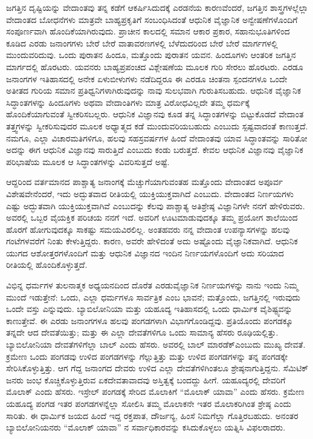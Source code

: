 ಜಗತ್ತಿನ ದೃಷ್ಟಿಯನ್ನು ವೇದಾಂತವು ತನ್ನ ಕಡೆಗೆ ಆಕರ್ಷಿಸಿದುದಕ್ಕೆ ಎರಡನೆಯ ಕಾರಣವೆಂದರೆ, ಜಗತ್ತಿನ ಶಾಸ್ತ್ರಗಳಲ್ಲೆಲ್ಲಾ ವೇದಾಂತದ ಬೋಧನೆಗಳು ಮಾತ್ರವೇ ಬಾಹ್ಯಪ್ರಕೃತಿಗೆ ಸಂಬಂಧಿಸಿದಂತೆ ಆಧುನಿಕ ವೈಜ್ಞಾನಿಕ ಅನ್ವೇಷಣೆಗಳೊಂದಿಗೆ ಸಂಪೂರ್ಣವಾಗಿ ಹೊಂದಿಕೆಯಾಗಿರುವುದು. ಪ್ರಾಚೀನ ಕಾಲದಲ್ಲಿ ಸಮಾನ ಆಕಾರ ಪ್ರಕಾರ, ಸಹಾನುಭೂತಿಗಳಿಂದ ಕೂಡಿದ ಎರಡು ಜನಾಂಗಗಳು ಬೇರೆ ಬೇರೆ ವಾತಾವರಣಗಳಲ್ಲಿ ಬೆಳೆದುದರಿಂದ ಬೇರೆ ಬೇರೆ ಮಾರ್ಗಗಳಲ್ಲಿ ಮುಂದುವರಿದುವು. ಒಂದು ಪುರಾತನ ಹಿಂದೂ, ಮತ್ತೊಂದು ಪುರಾತನ ಯವನ. ಹಿಂದೂಗಳು ಆಂತರಿಕ ಜಗತ್ತಿನ ಮಾರ್ಗದಲ್ಲಿ ಹೊರಟರು. ಯವನರು ಬಾಹ್ಯಪ್ರಪಂಚದ ವಿಶ್ಲೇಷಣೆಯ ಮೂಲಕ ಗುರಿ ಸೇರಲು ಹೊರ\-ಟರು. ಎರಡೂ ಜನಾಂಗಗಳ ಇತಿಹಾಸದಲ್ಲಿ ಅನೇಕ ಏಳುಬೀಳುಗಳು ನಡೆದಿದ್ದರೂ ಈ ಎರಡೂ ಚಿಂತನಾ ಸ್ಪಂದನಗಳೂ ಒಂದೇ ಅತೀತದ ಗುರಿಯ ಸಮಾನ ಪ್ರತಿಧ್ವನಿಗಳಾಗಿರುವುದನ್ನು ನಾವು ಸುಲಭವಾಗಿ ಗುರುತಿಸಬಹುದು. ಆಧುನಿಕ ವೈಜ್ಞಾನಿಕ ಸಿದ್ಧಾಂತಗಳನ್ನು ಹಿಂದೂಗಳು ಅಥವಾ ವೇದಾಂತಿಗಳು ಮಾತ್ರ ವಿರೋಧವಿಲ್ಲದೇ ತಮ್ಮ ಧರ್ಮಕ್ಕೆ ಹೊಂದಿಕೆಯಾಗುವಂತೆ ಸ್ವೀಕರಿಸಬಲ್ಲರು. ಆಧುನಿಕ ವಿಜ್ಞಾನವು ಕೂಡ ತನ್ನ ಸಿದ್ಧಾಂತಗಳನ್ನು ಬಿಟ್ಟುಕೊಡದೆ ವೇದಾಂತ ತತ್ತ್ವಗಳನ್ನು ಸ್ವೀಕರಿಸುವುದರ ಮೂಲಕ ಅಧ್ಯಾತ್ಮದ ಕಡೆ ಮುಂದುವರಿಯಬಹುದು ಎಂಬುದು ಸ್ಪಷ್ಟವಾದಂತೆ ಕಾಣುತ್ತದೆ. ನಮಗೂ, ಎಲ್ಲಾ ವಿಚಾರಮತಿಗಳಿಗೂ, ಹಲವು ಸಹಸ್ರವರ್ಷಗಳ ಹಿಂದೆ ವೇದಾಂತವು ಯಾವ ಸಿದ್ಧಾಂತವನ್ನು ಸಾರಿತೋ ಅದನ್ನು ಈಗ ಆಧುನಿಕ ವಿಜ್ಞಾನವು ಸಾರುತ್ತಿದೆ ಎಂಬುದು ಕಂಡು ಬರುತ್ತದೆ. ಕೇವಲ ಆಧುನಿಕ ವಿಜ್ಞಾನವು ವೈಜ್ಞಾನಿಕ ಪರಿಭಾಷೆಯ ಮೂಲಕ ಆ ಸಿದ್ಧಾಂತಗಳನ್ನು ವಿವರಿಸುತ್ತದೆ ಅಷ್ಟೆ.

ಆದ್ದರಿಂದ ವರ್ತಮಾನದ ಪಾಶ್ಚಾತ್ಯ ಜನಾಂಗಕ್ಕೆ ಮೆಚ್ಚುಗೆಯಾಗುವಂತಹ ಮತ್ತೊಂದು ವೇದಾಂತದ ಅಪೂರ್ವ ವಿಶೇಷವೇನೆಂದರೆ, ಇದು ಅದ್ಭುತವಾದ ರೀತಿಯಲ್ಲಿ ಯುಕ್ತಿಯುಕ್ತವಾಗಿದೆ ಎಂಬುದು. ವೇದಾಂತದ ನಿರ್ಣಯಗಳು ಎಷ್ಟು ಅದ್ಭುತವಾಗಿ ಯುಕ್ತಿಯುಕ್ತವಾಗಿವೆ ಎಂಬುದನ್ನು ಕೆಲವು ಪಾಶ್ಚಾತ್ಯ ಅತಿಶ್ರೇಷ್ಠ ವಿಜ್ಞಾನಿಗಳೇ ನನಗೆ ಹೇಳಿರುವರು. ಅವರಲ್ಲಿ ಒಬ್ಬರ ವೈಯಕ್ತಿಕ ಪರಿಚಯ ನನಗೆ ಇದೆ. ಅವರಿಗೆ ಊಟಮಾಡುವುದಕ್ಕೂ ತಮ್ಮ ಪ್ರಯೋಗ ಶಾಲೆಯಿಂದ ಹೊರಗೆ ಹೋಗುವುದಕ್ಕೂ ಸಾಕಷ್ಟು ಸಮಯವಿರಲಿಲ್ಲ. ಅಂತಹವರು ನನ್ನ ವೇದಾಂತ ಉಪನ್ಯಾಸಗಳನ್ನು ಹಲವು ಗಂಟೆಗಳವರೆಗೆ ನಿಂತು ಕೇಳುತ್ತಿದ್ದರು. ಕಾರಣ, ಅವರೇ ಹೇಳಿದಂತೆ ಅದು ಅಷ್ಟೊಂದು ವೈಜ್ಞಾನಿಕವಾಗಿದೆ. ಆಧುನಿಕ ಯುಗದ ಆಶೋತ್ತರಗಳೊಂದಿಗೆ ಮತ್ತು ಆಧುನಿಕ ವಿಜ್ಞಾನದ ಇಂದಿನ ನಿರ್ಣಯಗಳೊಂದಿಗೆ ಅದು ಸರಿಯಾದ ರೀತಿಯಲ್ಲಿ ಹೊಂದಿಕೊಳ್ಳುತ್ತದೆ.

ವಿಭಿನ್ನ ಧರ್ಮಗಳ ತುಲನಾತ್ಮಕ ಅಧ್ಯಯನದಿಂದ ದೊರೆತ ಎರಡು\break ವೈಜ್ಞಾನಿಕ ನಿರ್ಣಯಗಳನ್ನು ನಾನು ಇಂದು ನಿಮ್ಮ ಮುಂದೆ ಇಡುತ್ತೇನೆ: ಒಂದು, ಎಲ್ಲಾ ಧರ್ಮಗಳೂ ಸಾರ್ವತ್ರಿಕ ಎಂಬ ಭಾವನೆ; ಮತ್ತೊಂದು, ಜಗತ್ತಿನಲ್ಲಿ ಇರುವುದು ಒಂದೇ ವಸ್ತು ಎನ್ನುವುದು. ಬ್ಯಾಬಿಲೋನಿಯಾ ಮತ್ತು ಯಹೂದ್ಯ ಇತಿಹಾಸದಲ್ಲಿ ಒಂದು ಧಾರ್ಮಿಕ ವೈಶಿಷ್ಟ್ಯವನ್ನು ಕಾಣುತ್ತೇವೆ. ಈ ಎರಡು ಜನಾಂಗಗಳೂ ಹಲವು ಪಂಗಡಗಳಾಗಿ ವಿಭಾಗಗೊಂಡಿದ್ದವು. ಪ್ರತಿಯೊಂದು ಪಂಗಡಕ್ಕೂ ತನ್ನದೇ ಆದ ದೇವತೆಯಿತ್ತು; ಮತ್ತು ಈ ಎಲ್ಲಾ ದೇವತೆಗಳಿಗೂ ಒಂದು ಸಾಮಾನ್ಯ ಹೆಸರು ರೂಢಿಯಲ್ಲಿತ್ತು. ಬ್ಯಾಬಿಲೋನಿಯಾ ದೇವತೆಗಳಿಗೆಲ್ಲಾ ಬಾಲ್​ ಎಂದು ಹೆಸರು. ಅವರಲ್ಲಿ ಬಾಲ್​ ಮಾರಡೆಕ್​ ಎಂಬುದು ಮುಖ್ಯ ದೇವತೆ. ಕ್ರಮೇಣ ಒಂದು ಪಂಗಡವು ಉಳಿದ ಪಂಗಡಗಳನ್ನು ಗೆಲ್ಲುತ್ತಿತ್ತು ಮತ್ತು ಉಳಿದ ಪಂಗಡಗಳನ್ನು ತನ್ನ ಪಂಗಡಕ್ಕೇ ಸೇರಿಸಿಕೊಳ್ಳುತ್ತಿತ್ತು. ಆಗ ಗೆದ್ದ ಜನಾಂಗದ ದೇವರು ಉಳಿದ ಎಲ್ಲಾ ದೇವತೆಗಳಿಗಿಂತಲೂ ಶ್ರೇಷ್ಠನಾಗುತ್ತಿದ್ದನು. ಸೆಮಿಟಿಕ್​ ಜನರು ಜಂಭ ಕೊಚ್ಚಿಕೊಳ್ಳುತ್ತಿರುವ ಏಕದೇವತಾವಾದವು ಅಸ್ತಿತ್ವಕ್ಕೆ ಬಂದದ್ದು ಹೀಗೆ. ಯಹೂದ್ಯರಲ್ಲಿ ದೇವರಿಗೆ ಮೊಲಾಕ್​ ಎಂದು ಹೆಸರು. ಇಸ್ರೇಲ್​ ಪಂಗಡಕ್ಕೆ ಸೇರಿದ ಮೊಲಾಕಿಗೆ “ಮೊಲಾಕ್​ ಯಾವಾ” ಎಂದು ಹೆಸರು. ಕ್ರಮೇಣ ಯಹೂದ್ಯ ಪಂಗಡ ಇತರ ಪಂಗಡಗಳನ್ನೆಲ್ಲಾ ಸೋಲಿಸಿ ತಮ್ಮ ಮೊಲಾಕನೇ ಇತರ ಮೊಲಾಕರಿಗಿಂತ ಶ್ರೇಷ್ಠ ಎಂದು ಸಾರಿತು. ಈ ಧಾರ್ಮಿಕ ಜಯದ ಹಿಂದೆ ಇದ್ದ ರಕ್ತಪಾತ, ದೌರ್ಜನ್ಯ, ಹಿಂಸೆ ನಿಮಗೆಲ್ಲಾ ಗೊತ್ತಿರಬಹುದು. ಅನಂತರ ಬ್ಯಾಬಿಲೋನಿಯನರು “ಮೊಲಾಕ್​ ಯಾವಾ” ನ ಸರ್ವಾಧಿಕಾರವನ್ನು ಕಸಿದುಕೊಳ್ಳಲು ಯತ್ನಿಸಿ ವಿಫಲರಾದರು.

